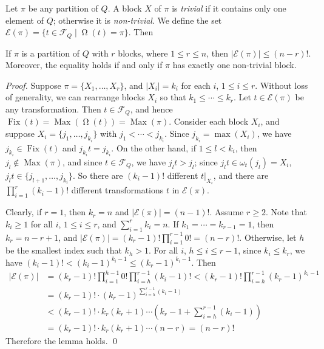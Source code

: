 \documentclass{llncs}
\renewcommand{\le}{\leqslant}
\renewcommand{\ge}{\geqslant}
\newcommand{\cE}{{\mathcal E}}
\newcommand{\cF}{{\mathcal F}}
\DeclareMathOperator{\Fix}{Fix}
\DeclareMathOperator{\Orbit}{\Omega}
\DeclareMathOperator{\Max}{Max}
\begin{document}
Let $\pi$ be any partition of $Q$. A block $X$ of $\pi$ is \emph{trivial} if it contains only one element of $Q$; otherwise it is \emph{non-trivial}. We define the set $\cE(\pi) = \{t \in \cF_Q \mid \Orbit(t) = \pi\}$. Then 

\begin{lemma}\label{lem:Ecard} 
If $\pi$ is a partition of $Q$ with $r$ blocks, where $1 \le r \le n$, then $|\cE(\pi)| \le (n-r)!$. Moreover, the equality holds if and only if $\pi$ has exactly one non-trivial block.
\end{lemma}

\begin{proof}
Suppose $\pi = \{X_1, \ldots, X_r\}$, and $|X_i| = k_i$ for each $i$, $1 \le i \le r$. Without loss of generality, we can rearrange blocks $X_i$ so that $k_1 \le \cdots \le k_r$. Let $t \in \cE(\pi)$ be any transformation. Then $t \in \cF_Q$, and hence $\Fix(t) = \Max(\Orbit(t)) = \Max(\pi)$. Consider each block $X_i$, and suppose $X_i = \{j_1, \ldots, j_{k_i}\}$ with $j_1 < \cdots < j_{k_i}$. Since $j_{k_i} = \max(X_i)$, we have $j_{k_i} \in \Fix(t)$ and $j_{k_i}t = j_{k_i}$. On the other hand, if $1 \le l < k_i$, then $j_l \not\in \Max(\pi)$, and since $t \in \cF_Q$, we have $j_l t > j_l$; since $j_l t \in \omega_t(j_l) = X_i$, $j_l t \in \{j_{l+1},\ldots,j_{k_i}\}$. So there are $(k_i-1)!$ different $t|_{X_i}$, and there are $\prod_{i=1}^r (k_i-1)!$ different transformations $t$ in $\cE(\pi)$. 

Clearly, if $r = 1$, then $k_r = n$ and $|\cE(\pi)| = (n-1)!$. Assume $r \ge 2$. Note that $k_i \ge 1$ for all $i$, $1 \le i \le r$, and $\sum_{i=1}^r k_i = n$. If $k_1 = \cdots = k_{r-1} = 1$, then $k_r = n-r+1$, and $|\cE(\pi)| = (k_r - 1)! \prod_{i=1}^{r-1}0! = (n-r)!$. Otherwise, let $h$ be the smallest index such that $k_h > 1$. For all $i$, $h \le i \le r-1$, since $k_i \le k_r$, we have $(k_i-1)! < (k_i-1)^{k_i-1} \le (k_r-1)^{k_i-1}$. Then
\begin{align*}
  |\cE(\pi)| &= (k_r-1)! \prod_{i=1}^{h-1}0! \prod_{i=h}^{r-1} (k_i-1)! 
             < (k_r-1)! \prod_{i=h}^{r-1} (k_r-1)^{k_i-1} \\
             &= (k_r-1)! \cdot (k_r-1)^{\sum_{i=h}^{r-1}(k_i-1)} \\
             &< (k_r-1)! \cdot k_r (k_r+1) \cdots (k_r-1+\sum_{i=h}^{r-1}(k_i-1)) \\
             &= (k_r-1)! \cdot k_r (k_r+1) \cdots (n-r) 
             = (n-r)!
\end{align*}
Therefore the lemma holds. \qed
\end{proof}
\end{document}
